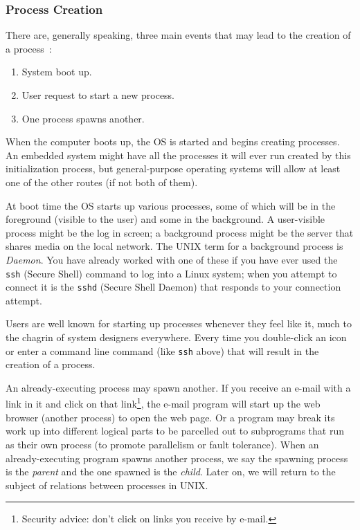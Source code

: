\subsubsection*{Process Creation}
There are, generally speaking, three main events that may lead to the creation of a process~\cite{mos}:

\begin{enumerate}
	\item System boot up.
	\item User request to start a new process.
	\item One process spawns another.
\end{enumerate}

When the computer boots up, the OS is started and begins creating processes. An embedded system might have all the processes it will ever run created by this initialization process, but general-purpose operating systems will allow at least one of the other routes (if not both of them).

At boot time the OS starts up various processes, some of which will be in the foreground (visible to the user) and some in the background. A user-visible process might be the log in screen; a background process might be the server that shares media on the local network. The UNIX term for a background process is \textit{Daemon}. You have already worked with one of these if you have ever used the \texttt{ssh} (Secure Shell) command to log into a Linux system; when you attempt to connect it is the \texttt{sshd} (Secure Shell Daemon) that responds to your connection attempt.

Users are well known for starting up processes whenever they feel like it, much to the chagrin of system designers everywhere. Every time you double-click an icon or enter a command line command (like \texttt{ssh} above) that will result in the creation of a process.

An already-executing process may spawn another. If you receive an e-mail with a link in it and click on that link\footnote{Security advice: don't click on links you receive by e-mail.}, the e-mail program will start up the web browser (another process) to open the web page. Or a program may break its work up into different logical parts to be parcelled out to subprograms that run as their own process (to promote parallelism or fault tolerance). When an already-executing program spawns another process, we say the spawning process is the \textit{parent} and the one spawned is the \textit{child}. Later on, we will return to the subject of relations between processes in UNIX.

